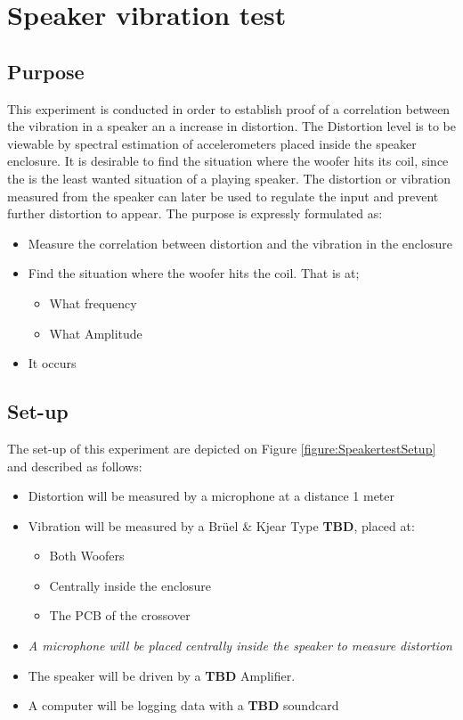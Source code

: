 \chapter{Speaker vibration test} \label{app:journal_speaker_test}

\section{Purpose}

This experiment is conducted in order to establish proof of a correlation between the vibration in a speaker an a increase in distortion. The Distortion level is to be viewable by spectral estimation of accelerometers placed inside the speaker enclosure. It is desirable to find the situation where the woofer hits its coil, since the is the least wanted situation of a playing speaker. The distortion or vibration measured from the speaker can later be used to regulate the input and prevent further distortion to appear. The purpose is expressly formulated as:
\begin{itemize}
\item Measure the correlation between distortion and the vibration in the enclosure
\item Find the situation where the woofer hits the coil. That is at;
\begin{itemize}
\item What frequency 
\item What Amplitude
\end{itemize}
\item [] It occurs 
\end{itemize}

\section{Set-up}

The set-up of this experiment are depicted on Figure \ref{figure:SpeakertestSetup} and described as follows:
\begin{itemize}
\item Distortion will be measured by a microphone at a distance 1 meter
\item Vibration will be measured by a Brüel \& Kjear Type \textbf{TBD}, placed at:
\begin{itemize}
\item Both Woofers
\item Centrally inside the enclosure 
\item The PCB of the crossover
\end{itemize}
\item \textit{A microphone will be placed centrally inside the speaker to measure distortion}
\item The speaker will be driven by a \textbf{TBD} Amplifier.
\item A computer will be logging data with a \textbf{TBD} soundcard
\end{itemize}

